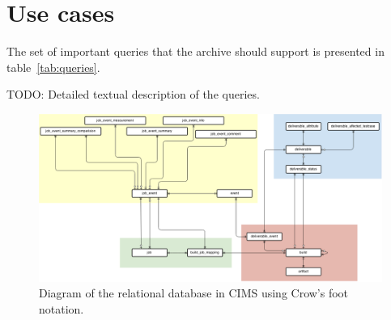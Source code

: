 \section{Use cases}
The set of important queries that the archive should support is presented in table~\ref{tab:queries}.

TODO: Detailed textual description of the queries.

\begin{figure}[h!]
\centering
\includegraphics[scale=0.5, angle=90]{figure/sql.png}
\caption{Diagram of the relational database in CIMS using Crow's foot notation.}
\label{fig:sql}
\end{figure}

